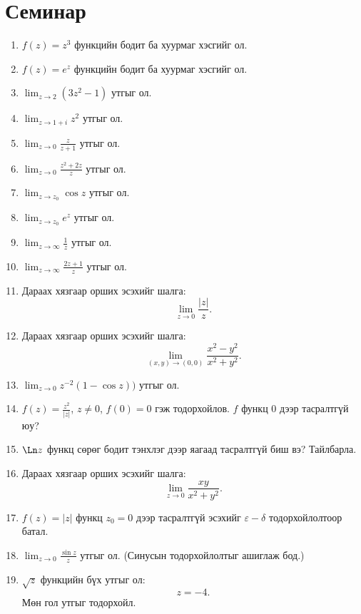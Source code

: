 \section{Семинар}
\begin{enumerate}

\item $f(z)=z^3$ функцийн бодит ба хуурмаг хэсгийг ол.

\item $f(z)=e^z$ функцийн бодит ба хуурмаг хэсгийг ол.

\item $\displaystyle \lim_{z\to 2} (3z^2-1)$ утгыг ол.

\item $\displaystyle \lim_{z\to 1+i} z^2$ утгыг ол.

\item $\displaystyle \lim_{z\to 0} \frac{z}{z+1}$ утгыг ол.

\item $\displaystyle \lim_{z\to 0} \frac{z^2+2z}{z}$ утгыг ол.

\item $\displaystyle \lim_{z\to z_0} \cos z$ утгыг ол.

\item $\displaystyle \lim_{z\to z_0} e^z$ утгыг ол.

\item $\displaystyle \lim_{z\to \infty} \frac{1}{z}$ утгыг ол.

\item $\displaystyle \lim_{z\to \infty} \frac{2z+1}{z}$ утгыг ол.

\item Дараах хязгаар орших эсэхийг шалга:
\[
\lim_{z\to 0} \frac{|z|}{z}.
\]

\item Дараах хязгаар орших эсэхийг шалга:
\[
\lim_{(x,y)\to(0,0)} \frac{x^2-y^2}{x^2+y^2}.
\]

\item $\displaystyle \lim_{z\to 0}z^{-2}(1-\cos z))$ утгыг ол.

\item $f(z)=\frac{z^2}{|z|}$, $z\neq 0$, $f(0)=0$ гэж тодорхойлов.
$f$ функц 0 дээр тасралтгүй юу?

\item $\Ln z$ функц сөрөг бодит тэнхлэг дээр яагаад тасралтгүй биш вэ?
Тайлбарла.

\item Дараах хязгаар орших эсэхийг шалга:
\[
\lim_{z\to 0} \frac{xy}{x^2+y^2}.
\]

\item $f(z)=|z|$ функц $z_0=0$ дээр тасралтгүй эсэхийг $\varepsilon -\delta$ тодорхойлолтоор батал.

\item $\displaystyle \lim_{z\to 0} \frac{\sin z}{z}$ утгыг ол.
(Синусын тодорхойлолтыг ашиглаж бод.)

\item $\sqrt{z}$ функцийн бүх утгыг ол:
\[
z=-4.
\]
Мөн гол утгыг тодорхойл.

\end{enumerate}
